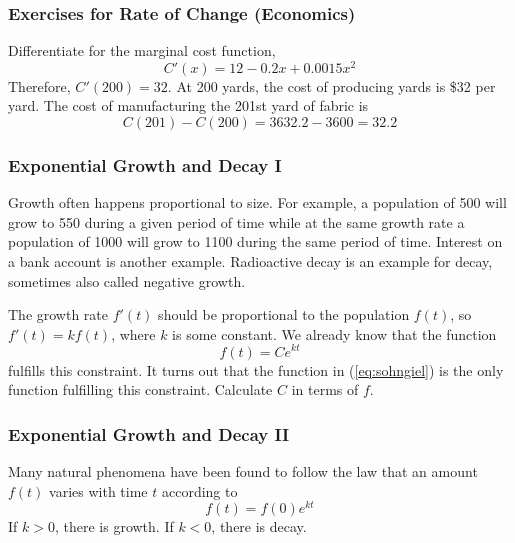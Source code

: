 \documentclass[xcolor=dvipsnames]{beamer}
\begin{document}
\begin{frame}
  \frametitle{Exercises for Rate of Change (Economics)}
  Differentiate for the marginal cost function,
  \begin{equation}
    \label{eq:zingohlu}
    C'(x)=12-0.2x+0.0015x^{2}
  \end{equation}
Therefore, $C'(200)=32$. At 200 yards, the cost of producing yards is
\$32 per yard. The cost of manufacturing the 201st
yard of fabric is
\begin{equation}
  \label{eq:goozahsu}
  C(201)-C(200)=3632.2-3600=32.2
\end{equation}
\end{frame}

\begin{frame}
  \frametitle{Exponential Growth and Decay I}
  Growth often happens proportional to size. For example, a population
  of 500 will grow to 550 during a given period of time while at the
  same growth rate a population of 1000 will grow to 1100 during the
  same period of time. Interest on a bank account is another example.
  Radioactive decay is an example for decay, sometimes also called
  negative growth. 

\bigskip

The growth rate $f'(t)$ should be proportional to the population
$f(t)$, so $f'(t)=kf(t)$, where $k$ is some constant. We already know
that the function
\begin{equation}
  \label{eq:sohngiel}
  f(t)=Ce^{kt}
\end{equation}
fulfills this constraint. It turns out that the function in
(\ref{eq:sohngiel}) is the only function fulfilling this constraint.
Calculate $C$ in terms of $f$.
\end{frame}

\begin{frame}
  \frametitle{Exponential Growth and Decay II}
Many natural phenomena have been found to follow the law that an
amount $f(t)$ varies with time $t$ according to
  \begin{equation}
    \label{eq:lauwutho}
    f(t)=f(0)e^{kt}
  \end{equation}
If $k>0$, there is growth. If $k<0$, there is decay.
\end{frame}
\end{document}
